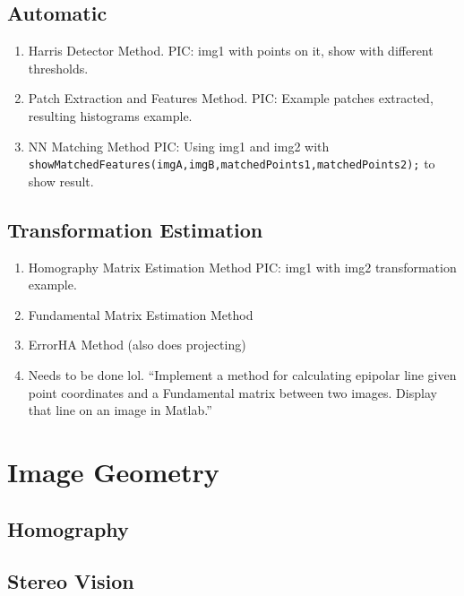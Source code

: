 \documentclass[a4paper, 10pt, conference]{ieeeconf}
\begin{document}
\subsection{Automatic}
\begin{enumerate}
    \item Harris Detector Method. PIC: img1 with points on it, show with different thresholds.
    \item Patch Extraction and Features Method. PIC: Example patches extracted, resulting histograms example.
    \item NN Matching Method PIC: Using img1 and img2 with
    \texttt{showMatchedFeatures(imgA,imgB,matchedPoints1,matchedPoints2);} to show result.
\end{enumerate}

\subsection{Transformation Estimation}
\begin{enumerate}
    \item Homography Matrix Estimation Method PIC: img1 with img2 transformation example. 
    \item Fundamental Matrix Estimation Method
    \item ErrorHA Method (also does projecting)
    \item Needs to be done lol. ``Implement a method for calculating epipolar line given point coordinates and a
Fundamental matrix between two images. Display that line on an image in Matlab.''
\end{enumerate}


\section{Image Geometry}

\subsection{Homography}



\subsection{Stereo Vision}

\cite{notes}


\end{document}
